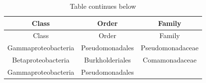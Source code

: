 \documentclass[]{article}
\begin{document}
\begin{longtable}[]{@{}ccc@{}}
\caption{Table continues below}\tabularnewline
\toprule
\begin{minipage}[b]{0.28\columnwidth}\centering\strut
Class\strut
\end{minipage} & \begin{minipage}[b]{0.30\columnwidth}\centering\strut
Order\strut
\end{minipage} & \begin{minipage}[b]{0.30\columnwidth}\centering\strut
Family\strut
\end{minipage}\tabularnewline
\midrule
\endfirsthead
\toprule
\begin{minipage}[b]{0.28\columnwidth}\centering\strut
Class\strut
\end{minipage} & \begin{minipage}[b]{0.30\columnwidth}\centering\strut
Order\strut
\end{minipage} & \begin{minipage}[b]{0.30\columnwidth}\centering\strut
Family\strut
\end{minipage}\tabularnewline
\midrule
\endhead
\begin{minipage}[t]{0.28\columnwidth}\centering\strut
Gammaproteobacteria\strut
\end{minipage} & \begin{minipage}[t]{0.30\columnwidth}\centering\strut
Pseudomonadales\strut
\end{minipage} & \begin{minipage}[t]{0.30\columnwidth}\centering\strut
Pseudomonadaceae\strut
\end{minipage}\tabularnewline
\begin{minipage}[t]{0.28\columnwidth}\centering\strut
Betaproteobacteria\strut
\end{minipage} & \begin{minipage}[t]{0.30\columnwidth}\centering\strut
Burkholderiales\strut
\end{minipage} & \begin{minipage}[t]{0.30\columnwidth}\centering\strut
Comamonadaceae\strut
\end{minipage}\tabularnewline
\begin{minipage}[t]{0.28\columnwidth}\centering\strut
Gammaproteobacteria\strut
\end{minipage} & \begin{minipage}[t]{0.30\columnwidth}\centering\strut
Pseudomonadales\strut
\end{minipage} & \begin{minipage}[t]{0.30\columnwidth}\centering\strut

\end{minipage}
\end{longtable}
\end{document}
